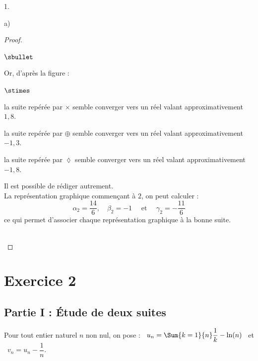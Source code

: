 \documentclass[11pt]{article}%
\begin{document}
\begin{noliste}{1.}
\begin{noliste}{a)}
\begin{proof}
\begin{noliste}{$\sbullet$}
      \item Or, d'après la figure :
        \begin{noliste}{$\stimes$}
        \item la suite repérée par $\times$ semble converger vers un
          réel valant approximativement $1,8$.%
        \item la suite repérée par $\oplus$ semble converger vers un
          réel valant approximativement $-1,3$.%
        \item la suite repérée par $\lozenge$ semble converger vers un
          réel valant approximativement $-1,8$.%
        \end{noliste}
      \end{noliste}
      \begin{remark}%
        Il est possible de rédiger autrement.\\
        La représentation graphique commençant à $2$, on peut calculer
        :
        \[
        \alpha_2 = \dfrac{14}{6}, \quad \beta_2 = -1 \quad \text{ et }
        \quad \gamma_2 = -\dfrac{11}{6}
        \]
        ce qui permet d'associer chaque représentation graphique à la
        bonne suite.
      \end{remark}~\\[-1.2cm]
    \end{proof}
  \end{noliste}
\end{noliste}

\section*{Exercice 2}

\subsection*{Partie I : Étude de deux suites}

\noindent
Pour tout entier naturel $n$ non nul, on pose : \ $u_{n} = \Sum{k =
  1}{n} \dfrac{1}{k} - \ln(n)$ \ et \ $v_{n} = u_{n} - \dfrac{1}{n}$.
\end{document}
